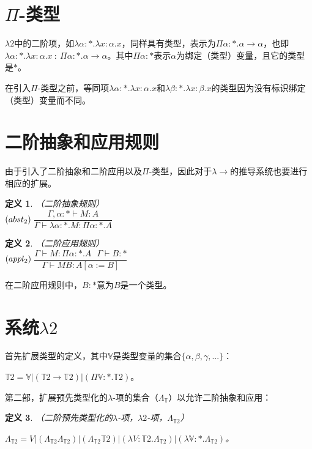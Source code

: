 \documentclass[UTF8]{article}
\newtheorem{thm}{定义}[section]
\begin{document}
	\section{$\Pi$-类型}
		$\lambda{2}$中的二阶项，如$\lambda\alpha:*.\lambda x:\alpha.x$，同样具有类型，表示为$\Pi\alpha:*.\alpha\rightarrow\alpha$，也即$\lambda\alpha:*.\lambda x:\alpha.x\ :\ \Pi\alpha:*.\alpha\rightarrow\alpha$。其中$\Pi\alpha:*$表示$\alpha$为绑定（类型）变量，且它的类型是$*$。
		
		在引入$\Pi$-类型之前，等同项$\lambda\alpha:*.\lambda x:\alpha.x$和$\lambda\beta:*.\lambda x:\beta.x$的类型因为没有标识绑定（类型）变量而不同。
	
	\section{二阶抽象和应用规则}
		由于引入了二阶抽象和二阶应用以及$\Pi$-类型，因此对于$\lambda{\rightarrow}$的推导系统也要进行相应的扩展。
		
		\begin{thm}（二阶抽象规则）\\
			
			${\rm(}abst_2{\rm)}$$\ \dfrac{\Gamma,\alpha:*\vdash M:A}{\Gamma\vdash\lambda\alpha:*.M:\Pi\alpha:*.A}$
		\end{thm}
	
		\begin{thm}（二阶应用规则）\\
			
			${\rm(}appl_2{\rm)}$$\ \dfrac{\Gamma\vdash M:\Pi\alpha:*.A\ \ \ \Gamma\vdash B:*}{\Gamma\vdash MB:A[\alpha:=B]}$
		\end{thm}
	
		在二阶应用规则中，$B:*$意为$B$是一个类型。
		
	\section{系统$\lambda{2}$}
		首先扩展类型的定义，其中$\mathbb{V}$是类型变量的集合$\{\alpha,\beta,\gamma,...\}$：
		
		$\mathbb{T}2 = \mathbb{V}|(\mathbb{T}2\rightarrow\mathbb{T}2)|(\Pi\mathbb{V}:*.\mathbb{T}2)$。
		
		第二部，扩展预先类型化的$\lambda$-项的集合（$\Lambda_{\mathbb{T}}$）以允许二阶抽象和应用：
		
		\begin{thm}（二阶预先类型化的$\lambda$-项，$\lambda{2}$-项，$\Lambda_{\mathbb{T}2}$）
			
			$\Lambda_{\mathbb{T}2} = V|(\Lambda_{\mathbb{T}2}\Lambda_{\mathbb{T}2})|(\Lambda_{\mathbb{T}2}\mathbb{T}2)|(\lambda V:\mathbb{T}2.\Lambda_{\mathbb{T}2})|(\lambda\mathbb{V}:*.\Lambda_{\mathbb{T}2})$。
		\end{thm}
	
\end{document}
